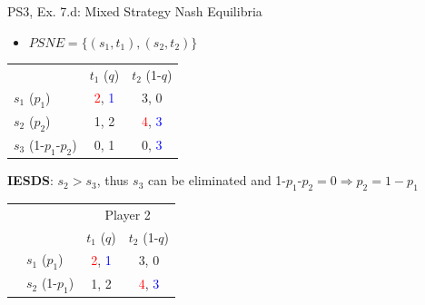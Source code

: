 \begin{frame}{PS3, Ex. 7.d: Mixed Strategy Nash Equilibria}
  \begin{multicols}{2}
    \begin{itemize}
      \item[(d)] $PSNE=\{(s_1,t_1),(s_2,t_2)\}$
    \end{itemize}
    \begin{table}
      \begin{tabular}{l|c|c|}
          \multicolumn{1}{c}{}  & \multicolumn{1}{c}{$t_1$ ($q$)} & \multicolumn{1}{c}{$t_2$ (1-$q$)} \\\cline{2-3}
          $s_1$ ($p_1$)         & \textcolor{red}{2}, \textcolor{blue}{1} & 3, 0 \\\cline{2-3}
          $s_2$ ($p_2$)         & 1, 2 & \textcolor{red}{4}, \textcolor{blue}{3} \\\cline{2-3}
          $s_3$ (1-$p_1$-$p_2$) & 0, 1 & 0, \textcolor{blue}{3} \\\cline{2-3}
      \end{tabular}
    \end{table}
    \textbf{IESDS}: $s_2>s_3$, thus $s_3$ can be eliminated and 1-$p_1$-$p_2=0\Rightarrow p_2=1-p_1$
    \begin{table}
      \begin{tabular}{cl|c|c|}
        & \multicolumn{1}{c}{} & \multicolumn{2}{c}{\color{blue}Player 2}\\
        \parbox[t]{1mm}{}
        &   &  &  \\
        & $s_1$ ($p_1$)  & \textcolor{red}{2}, \textcolor{blue}{1} & 3, 0 \\
        & $s_2$ (1-$p_1$)& 1, 2 & \textcolor{red}{4}, \textcolor{blue}{3} \\
      \end{tabular}
    \end{table}
  \vfill\null \columnbreak
  \vfill\null
  \end{multicols}
\end{frame}
